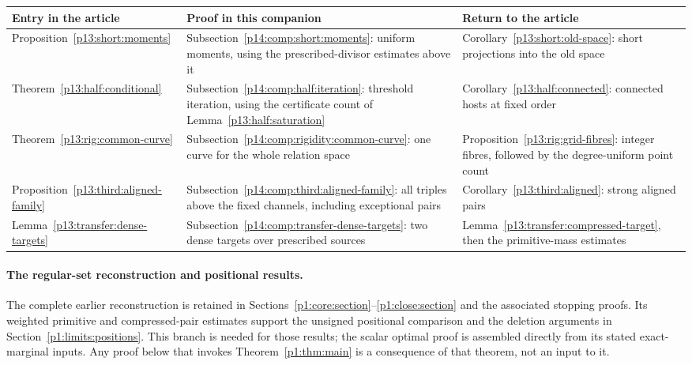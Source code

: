 \begin{center}
\small
\begin{tabularx}{\textwidth}{@{}>{\raggedright\arraybackslash}p{}>{\raggedright\arraybackslash}p{}>{\raggedright\arraybackslash}X@{}}
\toprule
Entry in the article & Proof in this companion & Return to the article\\
\midrule
Proposition~\ref{p13:short:moments}
& Subsection~\ref{p14:comp:short:moments}: uniform moments, using
the prescribed-divisor estimates above it
& Corollary~\ref{p13:short:old-space}: short projections into the old space\\[4pt]
Theorem~\ref{p13:half:conditional}
& Subsection~\ref{p14:comp:half:iteration}: threshold iteration,
using the certificate count of Lemma~\ref{p13:half:saturation}
& Corollary~\ref{p13:half:connected}: connected hosts at fixed order\\[4pt]
Theorem~\ref{p13:rig:common-curve}
& Subsection~\ref{p14:comp:rigidity:common-curve}: one curve for
the whole relation space
& Proposition~\ref{p13:rig:grid-fibres}: integer fibres, followed
by the degree-uniform point count\\[4pt]
Proposition~\ref{p13:third:aligned-family}
& Subsection~\ref{p14:comp:third:aligned-family}: all triples above
the fixed channels, including exceptional pairs
& Corollary~\ref{p13:third:aligned}: strong aligned pairs\\[4pt]
Lemma~\ref{p13:transfer:dense-targets}
& Subsection~\ref{p14:comp:transfer-dense-targets}: two dense targets
over prescribed sources
& Lemma~\ref{p13:transfer:compressed-target}, then the primitive-mass estimates\\
\bottomrule
\end{tabularx}
\end{center}

\paragraph{The regular-set reconstruction and positional results.}
The complete earlier reconstruction is retained in
Sections~\ref{p1:core:section}--\ref{p1:close:section} and
the associated stopping proofs. Its weighted primitive and
compressed-pair estimates support the unsigned positional
comparison and the deletion arguments in
Section~\ref{p1:limits:positions}. This branch is needed for
those results; the scalar optimal proof is assembled directly
from its stated exact-marginal inputs. Any proof below that
invokes Theorem~\ref{p1:thm:main} is a consequence of that
theorem, not an input to it.

